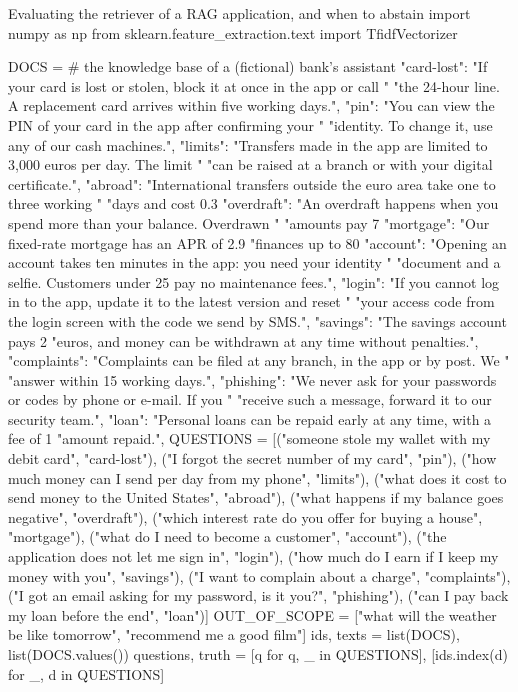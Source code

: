 \begin{pylisting}[label={lst:rag}]{Evaluating the retriever of a RAG application, and when to abstain}
import numpy as np
from sklearn.feature_extraction.text import TfidfVectorizer

DOCS = {   # the knowledge base of a (fictional) bank's assistant
    "card-lost": "If your card is lost or stolen, block it at once in the app or call "
                 "the 24-hour line. A replacement card arrives within five working days.",
    "pin": "You can view the PIN of your card in the app after confirming your "
           "identity. To change it, use any of our cash machines.",
    "limits": "Transfers made in the app are limited to 3,000 euros per day. The limit "
              "can be raised at a branch or with your digital certificate.",
    "abroad": "International transfers outside the euro area take one to three working "
              "days and cost 0.3%
    "overdraft": "An overdraft happens when you spend more than your balance. Overdrawn "
                 "amounts pay 7%
    "mortgage": "Our fixed-rate mortgage has an APR of 2.9%
                "finances up to 80%
    "account": "Opening an account takes ten minutes in the app: you need your identity "
               "document and a selfie. Customers under 25 pay no maintenance fees.",
    "login": "If you cannot log in to the app, update it to the latest version and reset "
             "your access code from the login screen with the code we send by SMS.",
    "savings": "The savings account pays 2%
               "euros, and money can be withdrawn at any time without penalties.",
    "complaints": "Complaints can be filed at any branch, in the app or by post. We "
                  "answer within 15 working days.",
    "phishing": "We never ask for your passwords or codes by phone or e-mail. If you "
                "receive such a message, forward it to our security team.",
    "loan": "Personal loans can be repaid early at any time, with a fee of 1%
            "amount repaid.",
}
QUESTIONS = [("someone stole my wallet with my debit card", "card-lost"),
             ("I forgot the secret number of my card", "pin"),
             ("how much money can I send per day from my phone", "limits"),
             ("what does it cost to send money to the United States", "abroad"),
             ("what happens if my balance goes negative", "overdraft"),
             ("which interest rate do you offer for buying a house", "mortgage"),
             ("what do I need to become a customer", "account"),
             ("the application does not let me sign in", "login"),
             ("how much do I earn if I keep my money with you", "savings"),
             ("I want to complain about a charge", "complaints"),
             ("I got an email asking for my password, is it you?", "phishing"),
             ("can I pay back my loan before the end", "loan")]
OUT_OF_SCOPE = ["what will the weather be like tomorrow", "recommend me a good film"]
ids, texts = list(DOCS), list(DOCS.values())
questions, truth = [q for q, _ in QUESTIONS], [ids.index(d) for _, d in QUESTIONS]


\end{pylisting}
